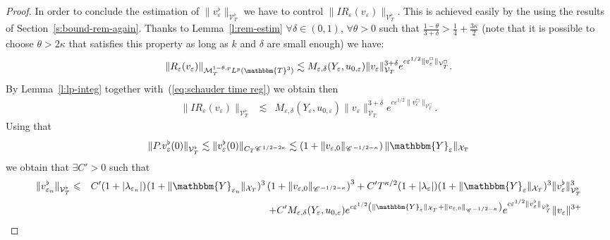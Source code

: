 \begin{proof}
  
  In order to conclude the estimation of $\| v^{\flat}_{\varepsilon}
  \|_{\mathcal{V}^{\flat}_T}$ we have to control $\| I R_{\varepsilon}
  (v_{\varepsilon}) \|_{\mathcal{V}^{\flat}_T}$. This is achieved easily by
  the using the results of Section~\ref{s:bound-rem-again}. Thanks to
  Lemma~\ref{l:rem-estim} $\forall \delta \in (0, 1)$, $\forall \theta > 0$
  such that $\frac{1 - \theta}{3 + \delta} > \frac{1}{4} + \frac{3 \kappa}{2}$
  (note that it is possible to choose $\theta > 2 \kappa$ that satisfies this
  property as long as $k$ and $\delta$ are small enough) we have:
  \[ \|R_{\varepsilon} (v_{\varepsilon}) \|_{\mathcal{M}^{1 - \theta, p}_T L^p
     (\mathbbm{T}^3)} \lesssim M_{\varepsilon, \delta} (Y_{\varepsilon}, u_{0,
     \varepsilon}) \| v_{\varepsilon} \|^{3 + \delta}_{\mathcal{V}_T} e^{c
     \varepsilon^{1 / 2} \|v^{\Box}_{\varepsilon} \|_{\mathcal{V}^{\Box}_T}} .
  \]
  By Lemma~\ref{l:lp-integ} together with~(\ref{eq:schauder time reg}) we
  obtain then
  \begin{eqnarray*}
    \| I R_{\varepsilon} (v_{\varepsilon}) \|_{\mathcal{V}^{\flat}_T} &
    \lesssim & M_{\varepsilon, \delta} (Y_{\varepsilon}, u_{0, \varepsilon})
    \| v_{\varepsilon} \|^{3 + \delta}_{\mathcal{V}_T} e^{c \varepsilon^{1 /
    2} \|v^{\Box}_{\varepsilon} \|_{\mathcal{V}_T^{\Box}}} .
  \end{eqnarray*}
  Using that
  \[ \| P_{\cdummy} v^{\flat}_{\varepsilon} (0) \|_{\mathcal{V}_T^{\flat}}
     \lesssim \| v^{\flat}_{\varepsilon} (0) \|_{C_T \CC^{1 / 2 - 2 \kappa}}
     \lesssim \left( 1 + \| v_{\varepsilon, 0} \|_{\CC^{- 1 / 2 - \kappa}}
     \right) \| \mathbbm{Y}_{\varepsilon} \|_{\mathcal{X}_T} \]
  we obtain that $\exists C' > 0$ such that
  \begin{eqnarray*}
    \| v^{\flat}_{\varepsilon_n} \|_{\mathcal{V}_T^{\flat}} & \leqslant & C'
    (1 + | \lambda_{\varepsilon_n} |)_{}  (1 + \| \mathbbm{Y}_{\varepsilon_n}
    \|_{\mathcal{X}_T})^3 \left( 1 + \| v_{\varepsilon, 0} \|_{\CC^{- 1 / 2 -
    \kappa}} \right)^3 + C' T^{\kappa / 2} (1 + | \lambda_{\varepsilon} |) (1
    + \| \mathbbm{Y}_{\varepsilon} \|_{\mathcal{X}_T})^3 \|
    v^{\flat}_{\varepsilon} \|_{\mathcal{V}^{\flat}_T}^3\\
    &  & + C' M_{\varepsilon, \delta} (Y_{\varepsilon}, u_{0, \varepsilon})
    e^{c \varepsilon^{1 / 2} \left( \| \mathbbm{Y}_{\varepsilon}
    \|_{\mathcal{X}_T} + \| v_{\varepsilon, 0} \|_{\CC^{- 1 / 2 - \kappa}}
    \right)} e^{c \varepsilon^{1 / 2} \| v^{\flat}_{\varepsilon}
    \|_{\mathcal{V}_T^{\flat}}} \| v_{\varepsilon} \|^{3 +
}
\end{eqnarray*}
\end{proof}
